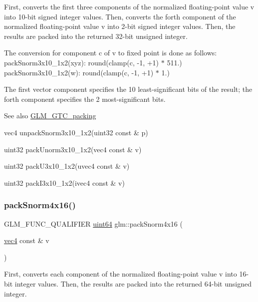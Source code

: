 First, converts the first three components of the normalized floating-\/point value v into 10-\/bit signed integer values. Then, converts the forth component of the normalized floating-\/point value v into 2-\/bit signed integer values. Then, the results are packed into the returned 32-\/bit unsigned integer.

The conversion for component c of v to fixed point is done as follows\+: pack\+Snorm3x10\+\_\+1x2(xyz)\+: round(clamp(c, -\/1, +1) $\ast$ 511.) pack\+Snorm3x10\+\_\+1x2(w)\+: round(clamp(c, -\/1, +1) $\ast$ 1.)

The first vector component specifies the 10 least-\/significant bits of the result; the forth component specifies the 2 most-\/significant bits.

\begin{DoxySeeAlso}{See also}
\hyperlink{group__gtc__packing}{G\+L\+M\+\_\+\+G\+T\+C\+\_\+packing} 

vec4 unpack\+Snorm3x10\+\_\+1x2(uint32 const \& p) 

uint32 pack\+Unorm3x10\+\_\+1x2(vec4 const \& v) 

uint32 pack\+U3x10\+\_\+1x2(uvec4 const \& v) 

uint32 pack\+I3x10\+\_\+1x2(ivec4 const \& v) 
\end{DoxySeeAlso}
\mbox{\label{group__gtc__packing_ga9b237d7c66b7a71964e6d1f4dc06539f}} 
\subsubsection{\texorpdfstring{pack\+Snorm4x16()}{packSnorm4x16()}}
{\footnotesize\ttfamily G\+L\+M\+\_\+\+F\+U\+N\+C\+\_\+\+Q\+U\+A\+L\+I\+F\+I\+ER \hyperlink{group__gtc__type__precision_gae3632bf9b37da66233d78930dd06378a}{uint64} glm\+::pack\+Snorm4x16 (\begin{DoxyParamCaption}\item[{\hyperlink{group__core__types_ga5881b1b022d7fd1b7218f5916532dd02}{vec4} const \&}]{v }\end{DoxyParamCaption})}

First, converts each component of the normalized floating-\/point value v into 16-\/bit integer values. Then, the results are packed into the returned 64-\/bit unsigned integer.

